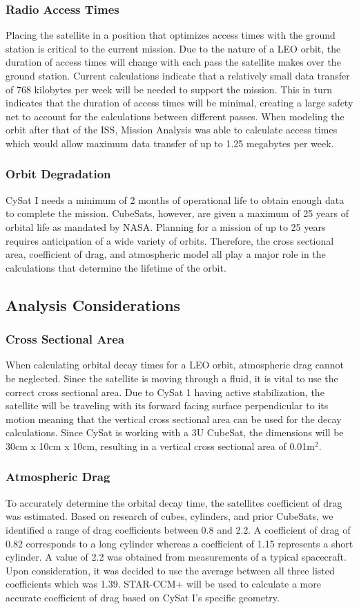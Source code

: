 \documentclass[nocover]            %
{CSLI}                       %
\begin{document}
\subsubsection{Radio Access Times}
Placing the satellite in a position that optimizes access times with the ground station is critical to the current mission. Due to the nature of a LEO orbit, the duration of access times will change with each pass the satellite makes over the ground station. Current calculations indicate that a relatively small data transfer of 768 kilobytes per week will be needed to support the mission. This in turn indicates that the duration of access times will be minimal, creating a large safety net to account for the calculations between different passes. When modeling the orbit after that of the ISS, Mission Analysis was able to calculate access times which would allow maximum data transfer of up to 1.25 megabytes per week. 
\subsubsection{Orbit Degradation} 
CySat I needs a minimum of 2 months of operational life to obtain enough data to complete the mission. CubeSats, however, are given a maximum of 25 years of orbital life as mandated by NASA. Planning for a mission of up to 25 years requires anticipation of a wide variety of orbits. Therefore, the cross sectional area, coefficient of drag, and atmospheric model all play a major role in the calculations that determine the lifetime of the orbit.
\subsection{Analysis Considerations}
\subsubsection{Cross Sectional Area}
When calculating orbital decay times for a LEO orbit, atmospheric drag cannot be neglected. Since the satellite is moving through a fluid, it is vital to use the correct cross sectional area. Due to CySat 1 having active stabilization, the satellite will be traveling with its forward facing surface perpendicular to its motion meaning that the vertical cross sectional area can be used for the decay calculations. Since CySat is working with a 3U CubeSat, the dimensions will be 30cm x 10cm x 10cm, resulting in a vertical cross sectional area of 0.01m$^2$.
\subsubsection{Atmospheric Drag}
To accurately determine the orbital decay time, the satellites coefficient of drag was estimated. Based on research of cubes, cylinders, and prior CubeSats, we identified a range of drag coefficients between 0.8 and 2.2. A coefficient of drag of 0.82 corresponds to a long cylinder whereas a coefficient of 1.15 represents a short cylinder. A value of 2.2 was obtained from measurements of a typical spacecraft. Upon consideration, it was decided to use the average between all three listed coefficients which was 1.39. STAR-CCM+ will be used to calculate a more accurate coefficient of drag based on CySat I's specific geometry.
\end{document}
